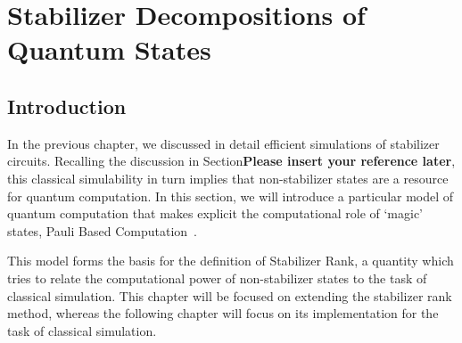 
\chapter{Stabilizer Decompositions of Quantum States}\label{chap:stabrank}
\section{Introduction}\label{sec:srank_intro}
In the previous chapter, we discussed in detail efficient simulations of stabilizer circuits. Recalling the discussion in Section\textbf{Please insert your reference later}, this classical simulability in turn implies that non-stabilizer states are a resource for quantum computation. In this section, we will introduce a particular model of quantum computation that makes explicit the computational role of `magic' states, Pauli Based Computation~\cite{Bravyi2015,Yoganathan2019}.\par
This model forms the basis for the definition of Stabilizer Rank, a quantity which tries to relate the computational power of non-stabilizer states to the task of classical simulation. This chapter will be focused on extending the stabilizer rank method, whereas the following chapter will focus on its implementation for the task of classical simulation.
